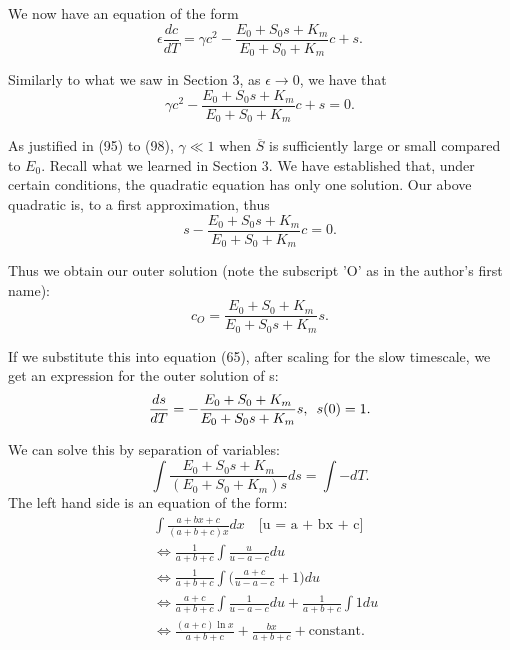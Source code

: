\documentclass[12pt]{article}
\begin{document}
We now have an equation of the form
\begin{equation}
  \epsilon \frac{dc}{dT} = \gamma c^2 - \frac{E_0+S_0 s+K_m}{E_0 + S_0 + K_m} c+ s.
\end{equation}

Similarly to what we saw in Section 3, as $\epsilon \to 0$, we have that
\begin{equation}
   \gamma c^2  - \frac{E_0+S_0 s+K_m}{E_0 + S_0 + K_m} c + s = 0.
\end{equation}

As justified in (95) to (98), $\gamma \ll 1$ when $\overline{S}$ is
sufficiently large or small compared to $E_0$. Recall what we learned
in Section 3. We have established that, under certain conditions, the
quadratic equation has only one solution. Our above quadratic is, to a
first approximation, thus
\begin{equation}
  s - \frac{E_0+S_0 s+K_m}{E_0 + S_0 + K_m} c = 0.
\end{equation}

Thus we obtain our outer solution (note the subscript 'O' as in the
author's first name):
\begin{equation}
  c_O = \frac{E_0 + S_0 + K_m}{E_0+S_0 s+K_m} s.
\end{equation}

If we substitute this into equation (65), after scaling for the slow
timescale, we get an expression for the outer solution of s:
\begin{equation}
\frac{ds}{dT} = - \frac{E_0 + S_0 + K_m}{E_0 + S_0s + K_m}s, \enskip s(0) = 1.
\end{equation}

We can solve this by separation of variables:
\begin{equation}
\int \frac{E_0 + S_0 s + K_m}{(E_0 + S_0 + K_m) s} ds = \int - dT.
\end{equation}
The left hand side is an equation of the form:
\begin{align}
&\int \frac{a + b x + c}{(a + b + c) x} dx
        \quad \text{[u = a + bx + c]} \\
&\iff \frac{1}{a+b+c} \int \frac{u}{u - a -c} du \\
&\iff \frac{1}{a+b+c} \int \Big(\frac{a+c}{u - a -c} + 1\Big)
                          du \\
&\iff \frac{a+c}{a+b+c} \int \frac{1}{u - a - c} du
                    + \frac{1}{a+b+c} \int 1 du \\
&\iff \frac{(a+c) \ln{x}}{a+b+c} + \frac{bx}{a+b+c} + \text{constant}.
\end{align}
\end{document}
